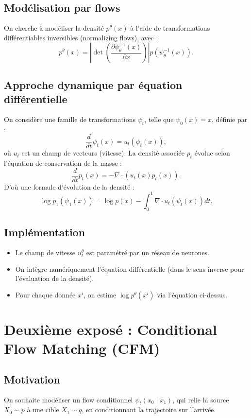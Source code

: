 \documentclass[11pt]{article}
\begin{document}
\subsection{Modélisation par flows}
On cherche à modéliser la densité \( p^\theta(x) \) à l’aide de transformations différentiables inversibles (normalizing flows), avec :
\[
p^\theta(x) = \left| \det \left( \frac{\partial \psi_\theta^{-1}(x)}{\partial x} \right) \right| p\left( \psi_\theta^{-1}(x) \right).
\]

\subsection{Approche dynamique par équation différentielle}
On considère une famille de transformations \( \psi_t \), telle que \( \psi_0(x) = x \), définie par :
\[
\frac{d}{dt} \psi_t(x) = u_t(\psi_t(x)),
\]
où \( u_t \) est un champ de vecteurs (vitesse).
La densité associée \( p_t \) évolue selon l’équation de conservation de la masse :
\[
\frac{d}{dt} p_t(x) = -\nabla \cdot (u_t(x) p_t(x)).
\]
D’où une formule d'évolution de la densité :
\[
\log p_1(\psi_1(x)) = \log p(x) - \int_0^1 \nabla \cdot u_t(\psi_t(x)) dt.
\]

\subsection{Implémentation}
\begin{itemize}
    \item Le champ de vitesse \( u_t^\theta \) est paramétré par un réseau de neurones.
    \item On intègre numériquement l’équation différentielle (dans le sens inverse pour l’évaluation de la densité).
    \item Pour chaque donnée \( x^i \), on estime \( \log p^\theta(x^i) \) via l’équation ci-dessus.
\end{itemize}



\section{Deuxième exposé : Conditional Flow Matching (CFM)}



\subsection{Motivation}
On souhaite modéliser un flow conditionnel \( \psi_t(x_0 \mid x_1) \), qui relie la source \( X_0 \sim p \) à une cible \( X_1 \sim q \), en conditionnant la trajectoire sur l’arrivée.
\end{document}
